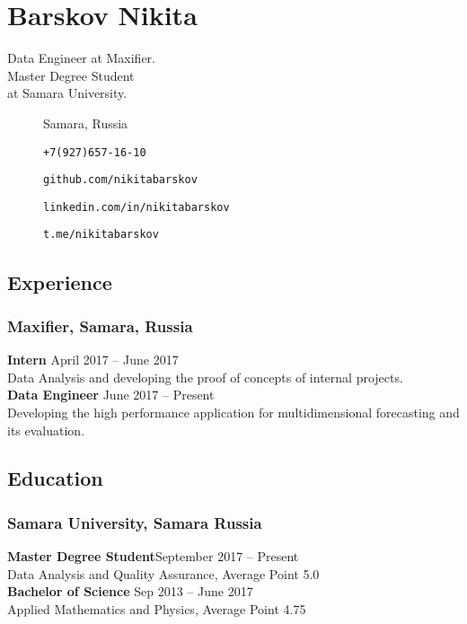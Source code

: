 \documentclass[12pt]{article}
\begin{document}
\section*{\textbf{Barskov Nikita}}
\begin{multicols}{2}
    Data Engineer at Maxifier. \\
    Master Degree Student \\
    at Samara University.
    \begin{description}
        \item[\faMapPin] Samara, Russia
    \end{description}
\columnbreak
\begin{description}
    \item[\faPhone] \texttt{+7(927)657-16-10}
    \item[\faGithub] \texttt{github.com/nikitabarskov}
    \item[\faLinkedin] \texttt{linkedin.com/in/nikitabarskov}
    \item[\faPaperPlane] \texttt{t.me/nikitabarskov}
\end{description}
\end{multicols}
\subsection*{Experience} 
\subsubsection*{Maxifier, Samara, Russia}
\textbf{Intern} \hfill April 2017 -- June 2017\\
Data Analysis and developing the proof of concepts of internal projects.\\
\textbf{Data Engineer} \hfill June 2017 -- Present\\
Developing the high performance application for multidimensional forecasting and its evaluation.
\subsection*{Education}
\subsubsection*{Samara University, Samara Russia}
\textbf{Master Degree Student}\hfill \hfill September 2017 -- Present\\
Data Analysis and Quality Assurance, Average Point 5.0\\
\textbf{Bachelor of Science} \hfill Sep 2013 -- June 2017\\
Applied Mathematics and Physics, Average Point 4.75
\end{document}
